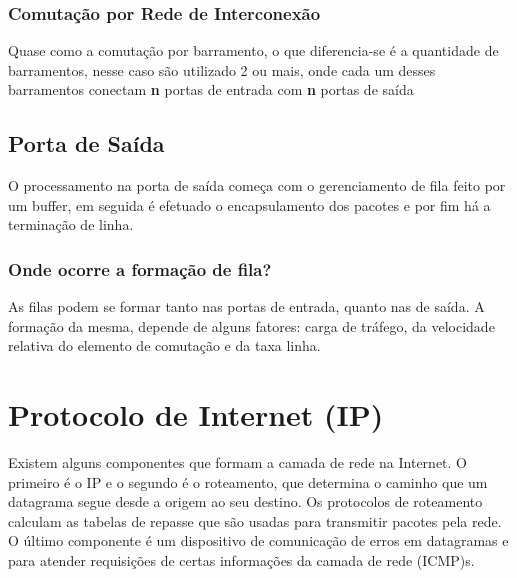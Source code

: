 \documentclass[a4paper, 12pt]{article}
\begin{document}
\subsubsection{Comutação por Rede de Interconexão}
Quase como a comutação por barramento, o que diferencia-se é a quantidade de barramentos, nesse caso são utilizado 2 ou mais, onde cada um 
desses barramentos conectam \textbf{n} portas de entrada com \textbf{n} portas de saída

\subsection{Porta de Saída}
O processamento na porta de saída começa com o gerenciamento de fila feito por um buffer, em seguida é efetuado o encapsulamento dos pacotes e por 
fim há a terminação de linha.

\subsubsection{Onde ocorre a formação de fila?}
As filas podem se formar tanto nas portas de entrada, quanto nas de saída. A formação 
da mesma, depende de alguns fatores: carga de tráfego, da velocidade relativa do 
elemento de comutação e da taxa linha.

\newpage
\section{Protocolo de Internet (IP)}
Existem alguns componentes que formam a camada de rede na Internet. O primeiro é o IP e o
segundo é o roteamento, que determina o caminho que um datagrama segue desde a origem ao
seu destino. Os protocolos de roteamento calculam as tabelas de repasse que são usadas
para transmitir pacotes pela rede. O último componente é um dispositivo de comunicação
de erros em datagramas e para atender requisições de certas informações da camada de 
rede (ICMP)s.
\end{document}
